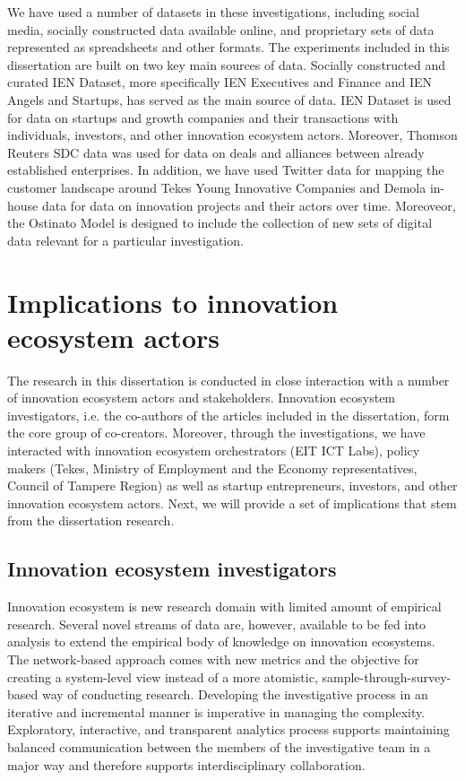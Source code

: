 We have used a number of datasets in these investigations, including social media, socially constructed data available online, and proprietary sets of data represented as spreadsheets and other formats. The experiments included in this dissertation are built on two key main sources of data. Socially constructed and curated IEN Dataset, more specifically IEN Executives and Finance and IEN Angels and Startups, has served as the main source of data. IEN Dataset is used for data on startups and growth companies and their transactions with individuals, investors, and other innovation ecosystem actors. Moreover, Thomson Reuters SDC data was used for data on deals and alliances between already established enterprises. In addition, we have used Twitter data for mapping the customer landscape around Tekes Young Innovative Companies and Demola in-house data for data on innovation projects and their actors over time. Moreoveor, the Ostinato Model is designed to include the collection of new sets of digital data relevant for a particular investigation.

\section{Implications to innovation ecosystem actors} 

The research in this dissertation is conducted in close interaction with a number of innovation ecosystem actors and stakeholders. Innovation ecosystem investigators, i.e. the co-authors of the articles included in the dissertation, form the core group of co-creators. Moreover, through the investigations, we have interacted with innovation ecosystem orchestrators (EIT ICT Labs), policy makers (Tekes, Ministry of Employment and the Economy representatives, Council of Tampere Region) as well as startup entrepreneurs, investors, and other innovation ecosystem actors. Next, we will provide a set of implications that stem from the dissertation research.

\subsection{Innovation ecosystem investigators}

Innovation ecosystem is new research domain with limited amount of empirical research. Several novel streams of data are, however, available to be fed into analysis to extend the empirical body of knowledge on innovation ecosystems. The network-based approach comes with new metrics and the objective for creating a system-level view instead of a more atomistic, sample-through-survey-based way of conducting research. Developing the investigative process in an iterative and incremental manner is imperative in managing the complexity. Exploratory, interactive, and transparent analytics process supports  maintaining balanced communication between the members of the investigative team in a major way and therefore supports interdisciplinary collaboration. 

